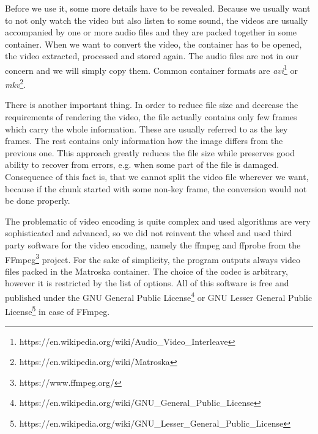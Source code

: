 Before we use it, some more details have to be revealed. Because we usually want to not only watch the video but also listen to some sound, the videos are usually accompanied by one or more audio files and they are packed together in some container. When we want to convert the video, the container has to be opened, the video extracted, processed and stored again. The audio files are not in our concern and we will simply copy them. Common container formats are \textit{avi}\footnote{https://en.wikipedia.org/wiki/Audio\_Video\_Interleave} or \textit{mkv}\footnote{https://en.wikipedia.org/wiki/Matroska}.

There is another important thing. In order to reduce file size and decrease the requirements of rendering the video, the file actually contains only few frames which carry the whole information. These are usually referred to as the key frames. The rest contains only information how the image differs from the previous one. This approach greatly reduces the file size while preserves good ability to recover from errors, e.g. when some part of the file is damaged. Consequence of this fact is, that we cannot split the video file wherever we want, because if the chunk started with some non-key frame, the conversion would not be done properly.

The problematic of video encoding is quite complex and used algorithms are very sophisticated and advanced, so we did not reinvent the wheel and used third party software for the video encoding, namely the ffmpeg and ffprobe from the FFmpeg\footnote{https://www.ffmpeg.org/} project. For the sake of simplicity, the program outputs always video files packed in the Matroska container. The choice of the codec is arbitrary, however it is restricted by the list of options. All of this software is free and published under the GNU General Public License\footnote{https://en.wikipedia.org/wiki/GNU\_General\_Public\_License} or GNU Lesser General Public License\footnote{https://en.wikipedia.org/wiki/GNU\_Lesser\_General\_Public\_License} in case of FFmpeg.

